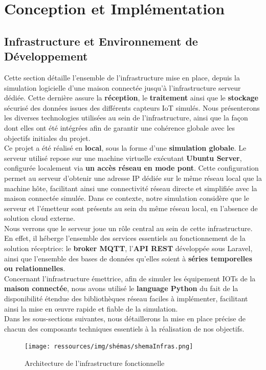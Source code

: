 \documentclass[10pt, a4paper]{report}
\begin{document}
	
	\chapter{Conception et Implémentation}
	
	\section{Infrastructure et Environnement de Développement}
	Cette section détaille l'ensemble de l’infrastructure mise en place, depuis la simulation logicielle d'une maison connectée jusqu'à l'infrastructure serveur dédiée. Cette dernière assure la \textbf{réception}, le \textbf{traitement} ainsi que le \textbf{stockage} sécurisé des données issues des différents capteurs IoT simulés. Nous présenterons les diverses technologies utilisées au sein de l'infrastructure, ainsi que la façon dont elles ont été intégrées afin de garantir une cohérence globale avec les objectifs initiales du projet.\\
	Ce projet a été réalisé en \textbf{local}, sous la forme d'une \textbf{simulation globale}. Le serveur utilisé repose sur une machine virtuelle exécutant \textbf{Ubuntu Server}, configurée localement via \textbf{un accès réseau en mode pont}. Cette configuration permet au serveur d'obtenir une adresse IP dédiée sur le même réseau local que la machine hôte, facilitant ainsi une connectivité réseau directe et simplifiée avec la maison connectée simulée. Dans ce contexte, notre simulation considère que le serveur et l’émetteur sont présents au sein du même réseau local, en l'absence de solution cloud externe.\\
	Nous verrons que le serveur joue un rôle central au sein de cette infrastructure. En effet, il héberge l'ensemble des services essentiels au fonctionnement de la solution réceptrice: le \textbf{broker MQTT}, l'\textbf{API REST} développée sous Laravel, ainsi que l'ensemble des bases de données qu'elles soient à\textbf{ séries temporelles ou relationnelles}.\\
	Concernant l'infrastructure émettrice, afin de simuler les équipement IOTs de la \textbf{maison connectée}, nous avons utilisé le\textbf{ language Python} du fait de la disponibilité étendue des bibliothèques réseau faciles à implémenter, facilitant ainsi la mise en œuvre rapide et fiable de la simulation. \\
	Dans les sous-sections suivantes, nous détaillerons la mise en place précise de chacun des composants techniques essentiels à la réalisation de nos objectifs.
		\begin{figure}[h!]
		\centering
		\texttt{[image: ressources/img/shémas/shemaInfras.png]}
		\caption{Architecture de l'infrastructure fonctionnelle}
		\label{fig:archiInfra}
	\end{figure}
	
\end{document}
